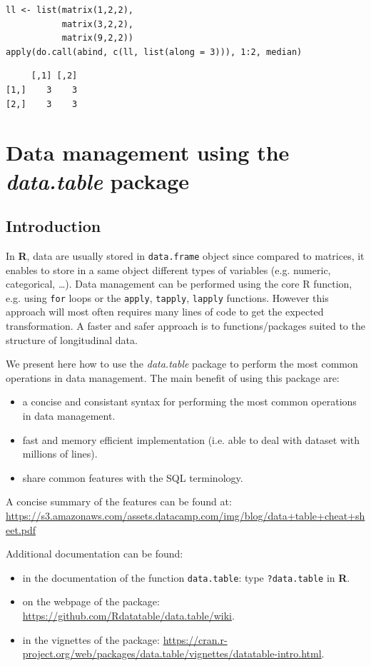 \documentclass{article}
\newcommand\Rlogo{\textbf{\textsf{R}}\xspace}
\begin{document}
\lstset{language=r,label= ,caption= ,captionpos=b,numbers=none}
\begin{lstlisting}
ll <- list(matrix(1,2,2),
		   matrix(3,2,2),
		   matrix(9,2,2))
apply(do.call(abind, c(ll, list(along = 3))), 1:2, median)
\end{lstlisting}

\begin{verbatim}
     [,1] [,2]
[1,]    3    3
[2,]    3    3
\end{verbatim}

\section{Data management using the \emph{data.table} package}
\label{sec:org8fe9377}
\subsection{Introduction}
\label{sec:org4bdf3c4}
In \Rlogo, data are usually stored in \texttt{data.frame} object since compared
to matrices, it enables to store in a same object different types of
variables (e.g. numeric, categorical, \ldots{}). Data management can be
performed using the core R function, e.g. using \texttt{for} loops or
the \texttt{apply}, \texttt{tapply}, \texttt{lapply} functions.  However this approach will
most often requires many lines of code to get the expected
transformation.  A faster and safer approach is to functions/packages
suited to the structure of longitudinal data.

\bigskip

We present here how to use the \emph{data.table} package to perform the
most common operations in data management. The main benefit of using
this package are:
\begin{itemize}
\item a concise and consistant syntax for performing the most common
operations in data management.
\item fast and memory efficient implementation (i.e. able to deal with
dataset with millions of lines).
\item share common features with the SQL terminology.
\end{itemize}
A concise summary of the features can be found at:
\url{https://s3.amazonaws.com/assets.datacamp.com/img/blog/data+table+cheat+sheet.pdf}

\bigskip

Additional documentation can be found:
\begin{itemize}
\item in the documentation of the function \texttt{data.table}: type \texttt{?data.table} in \Rlogo.
\item on the webpage of the package: \url{https://github.com/Rdatatable/data.table/wiki}.
\item in the vignettes of the package: \url{https://cran.r-project.org/web/packages/data.table/vignettes/datatable-intro.html}.
\end{itemize}
\end{document}
